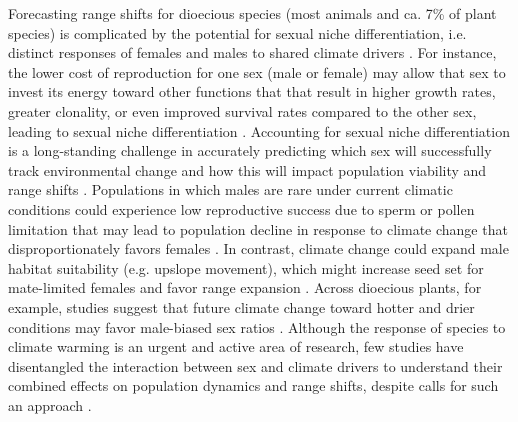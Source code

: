 \documentclass[12pt]{article}\usepackage[]{graphicx}\usepackage[dvipsnames]{xcolor}
\begin{document}
Forecasting range shifts for dioecious species (most animals and ca. 7\% of plant species) is complicated by the potential for sexual niche differentiation, i.e. distinct responses of females and males to shared climate drivers \citep{Tognetti2012,pottier2021sexual,hultine2016climate,morrison2016causes}. 
For instance, the lower cost of reproduction for one sex (male or female) may allow that sex to invest its energy toward other functions that that result in  higher growth rates, greater clonality, or even improved survival rates compared to the other sex, leading to sexual niche differentiation \citep{bruijning2017surviving}.
Accounting for sexual niche differentiation is a long-standing challenge in accurately predicting which sex will successfully track environmental change and how this will impact population viability and range shifts \citep{jones1999sex,gissi2023exploring}. 
Populations in which males are rare under current climatic conditions could experience low reproductive success due to sperm or pollen limitation that may lead to population decline in response to climate change that disproportionately favors females \citep{eberhart2017sex}.
In contrast, climate change could expand male habitat suitability (e.g. upslope movement), which might increase seed set for mate-limited females and favor range expansion \citep{petry2016sex}. 
Across dioecious plants, for example, studies suggest that future climate change toward hotter and drier conditions may favor male-biased sex ratios \citep{field2013comparative,hultine2016climate}. 
Although the response of species to climate warming is an urgent and active area of research, few studies have disentangled the interaction between sex and climate drivers to understand their combined effects on population dynamics and range shifts, despite calls for such an approach \citep{hultine2016climate,gissi2023exploring}.
\end{document}
